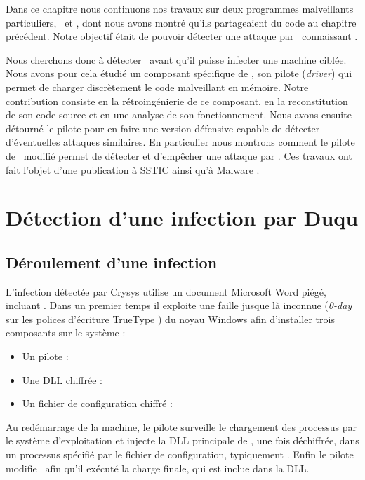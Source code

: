 Dans ce chapitre nous continuons nos travaux sur deux programmes malveillants particuliers, \duqu\ et \stux, dont nous avons montré qu'ils partageaient du code au chapitre précédent.
Notre objectif était de pouvoir détecter une attaque par \duqu\ connaissant \stux.

Nous cherchons donc à détecter \duqu\ avant qu'il puisse infecter une machine ciblée.
Nous avons pour cela étudié un composant spécifique de \duqu, son pilote (\emph{driver}) qui permet de charger discrètement le code malveillant en mémoire.
Notre contribution consiste en la rétroingénierie de ce composant, en la reconstitution de son code source et en une analyse de son fonctionnement.
Nous avons ensuite détourné le pilote pour en faire une version défensive capable de détecter d'éventuelles attaques similaires.
En particulier nous montrons comment le pilote de \duqu\ modifié permet de détecter et d'empêcher une attaque par \duqu.
Ces travaux ont fait l'objet d'une publication à SSTIC \cite{sstic13} ainsi qu'à  Malware \cite{mal13}.

\section{Détection d'une infection par Duqu}
\subsection{Déroulement d'une infection}
L'infection détectée par Crysys utilise un document Microsoft Word piégé, incluant \duqu.
Dans un premier temps il exploite une faille jusque là inconnue (\emph{0-day} sur les polices d'écriture TrueType \cite{CVETrueType}) du noyau Windows afin d'installer trois composants sur le système :
\begin{itemize}
 \item Un pilote : \driver
 \item Une DLL chiffrée : \netpDLL
 \item Un fichier de configuration chiffré : \netpCONF
\end{itemize}

Au redémarrage de la machine, le pilote surveille le chargement des processus par le système d'exploitation et injecte la DLL principale de \duqu, une fois déchiffrée, dans un processus spécifié par le fichier de configuration, typiquement \services.
Enfin le pilote modifie \services\ afin qu'il exécuté la charge finale, qui est inclue dans la DLL.

